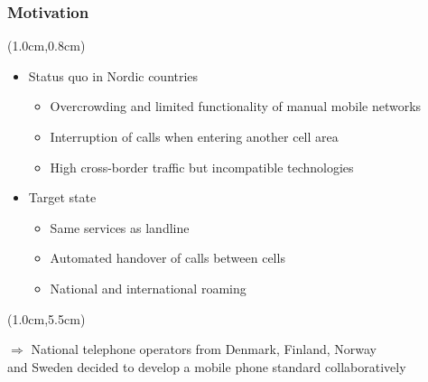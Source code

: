 \begin{frame}
  \frametitle{Motivation}
 \textblockorigin{0.0cm}{2.0cm}
 
 \begin{textblock*}{11cm}(1.0cm,0.8cm)
 \begin{itemize}
     \item Status quo in Nordic countries
     \begin{itemize}
      \item Overcrowding and limited functionality of manual mobile networks
      \item Interruption of calls when entering another cell area
      \item High cross-border traffic but incompatible technologies
     \end{itemize}
    \end{itemize}
 
 \vspace{0.5cm}
 
   \begin{itemize}
     \item Target state
      \begin{itemize}
	\item Same services as landline
        \item Automated handover of calls between cells
        \item National and international roaming
      \end{itemize}
    \end{itemize}
   \end{textblock*}
    
   \begin{textblock*}{11cm}(1.0cm,5.5cm)
   \begin{center}
     $\Rightarrow$ National telephone operators from Denmark, Finland, Norway\\and Sweden decided to develop a mobile
phone standard collaboratively
    \end{center} 
   \end{textblock*}
   

\end{frame}
